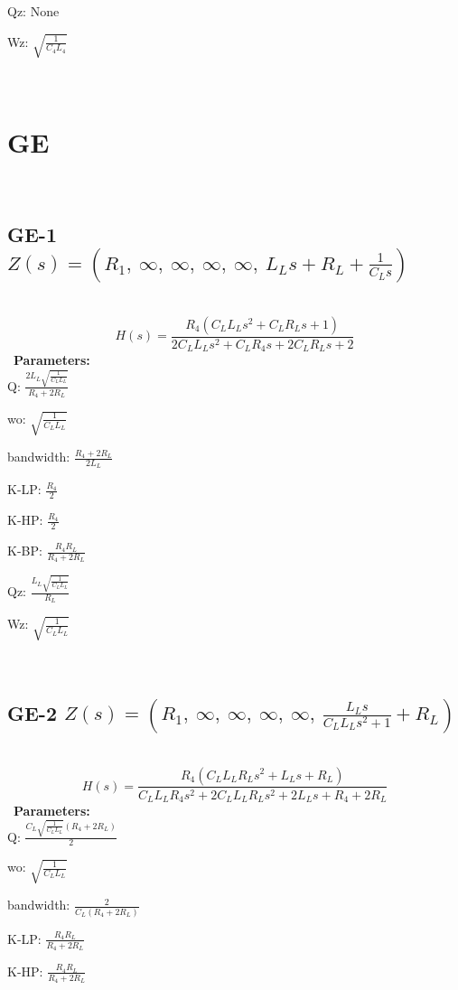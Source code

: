 \documentclass{article}
\begin{document}
Qz: $\text{None}$\ 

Wz: $\sqrt{\frac{1}{C_{4} L_{4}}}$\ 

\ 

\section{GE}\ 
\subsection{GE-1 $Z(s) = \left( R_{1}, \  \infty, \  \infty, \  \infty, \  \infty, \  L_{L} s + R_{L} + \frac{1}{C_{L} s}\right)$ } \ 
\textbf{\[H(s) = \frac{R_{4} \left(C_{L} L_{L} s^{2} + C_{L} R_{L} s + 1\right)}{2 C_{L} L_{L} s^{2} + C_{L} R_{4} s + 2 C_{L} R_{L} s + 2}\] } \ 
\textbf{Parameters:}\\ 

Q: $\frac{2 L_{L} \sqrt{\frac{1}{C_{L} L_{L}}}}{R_{4} + 2 R_{L}}$\ 

wo: $\sqrt{\frac{1}{C_{L} L_{L}}}$\ 

bandwidth: $\frac{R_{4} + 2 R_{L}}{2 L_{L}}$\ 

K-LP: $\frac{R_{4}}{2}$\ 

K-HP: $\frac{R_{4}}{2}$\ 

K-BP: $\frac{R_{4} R_{L}}{R_{4} + 2 R_{L}}$\ 

Qz: $\frac{L_{L} \sqrt{\frac{1}{C_{L} L_{L}}}}{R_{L}}$\ 

Wz: $\sqrt{\frac{1}{C_{L} L_{L}}}$\ 

\ 

\subsection{GE-2 $Z(s) = \left( R_{1}, \  \infty, \  \infty, \  \infty, \  \infty, \  \frac{L_{L} s}{C_{L} L_{L} s^{2} + 1} + R_{L}\right)$ } \ 
\textbf{\[H(s) = \frac{R_{4} \left(C_{L} L_{L} R_{L} s^{2} + L_{L} s + R_{L}\right)}{C_{L} L_{L} R_{4} s^{2} + 2 C_{L} L_{L} R_{L} s^{2} + 2 L_{L} s + R_{4} + 2 R_{L}}\] } \ 
\textbf{Parameters:}\\ 

Q: $\frac{C_{L} \sqrt{\frac{1}{C_{L} L_{L}}} \left(R_{4} + 2 R_{L}\right)}{2}$\ 

wo: $\sqrt{\frac{1}{C_{L} L_{L}}}$\ 

bandwidth: $\frac{2}{C_{L} \left(R_{4} + 2 R_{L}\right)}$\ 

K-LP: $\frac{R_{4} R_{L}}{R_{4} + 2 R_{L}}$\ 

K-HP: $\frac{R_{4} R_{L}}{R_{4} + 2 R_{L}}$\ 
\end{document}
